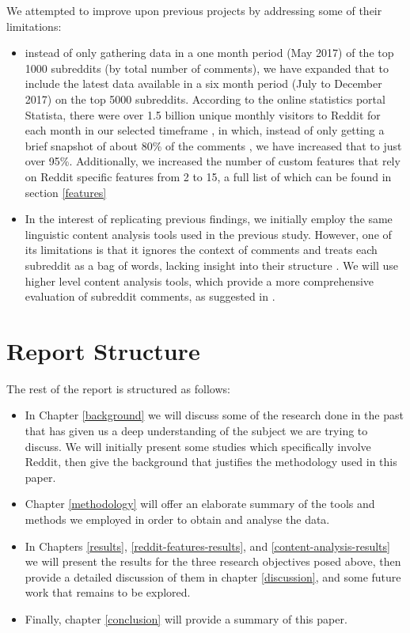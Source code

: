 \documentclass[bsc,frontabs,twoside,singlespacing,parskip,deptreport]{infthesis}
\begin{document}
We attempted to improve upon previous projects by addressing some of their limitations:
\begin{itemize}
	\item instead of only gathering data in a one month period (May 2017) of the top 1000 subreddits (by total number of comments), we have expanded that to include the latest data available in a six month period (July to December 2017) on the top 5000 subreddits. According to the online statistics portal Statista, there were over 1.5 billion unique monthly visitors to Reddit for each month in our selected timeframe \cite{statista}, in which, instead of only getting a brief snapshot of about 80\% of the comments \cite{masters}, we have increased that to just over 95\%. Additionally, we increased the number of custom features that rely on Reddit specific features from 2 to 15, a full list of which can be found in section \ref{features}
	\item In the interest of replicating previous findings, we initially employ the same linguistic content analysis tools used in the previous study. However, one of its limitations is that it ignores the context of comments and treats each subreddit as a bag of words, lacking insight into their structure \cite{masters}. We will use higher level content analysis tools, which provide a more comprehensive evaluation of subreddit comments, as suggested in \cite{lowe2002software}.
\end{itemize}

\section{Report Structure}
The rest of the report is structured as follows:
\begin{itemize}
	\item In Chapter \ref{background} we will discuss some of the research done in the past that has given us a deep understanding of the subject we are trying to discuss. We will initially present some studies which specifically involve Reddit, then give the background that justifies the methodology used in this paper.
	\item Chapter \ref{methodology} will offer an elaborate summary of the tools and methods we employed in order to obtain and analyse the data.
	\item In Chapters \ref{results}, \ref{reddit-features-results}, and \ref{content-analysis-results} we will present the results for the three research objectives posed above, then provide a detailed discussion of them in chapter \ref{discussion}, and some future work that remains to be explored.
	\item Finally, chapter \ref{conclusion} will provide a summary of this paper.
\end{itemize}
\end{document}
